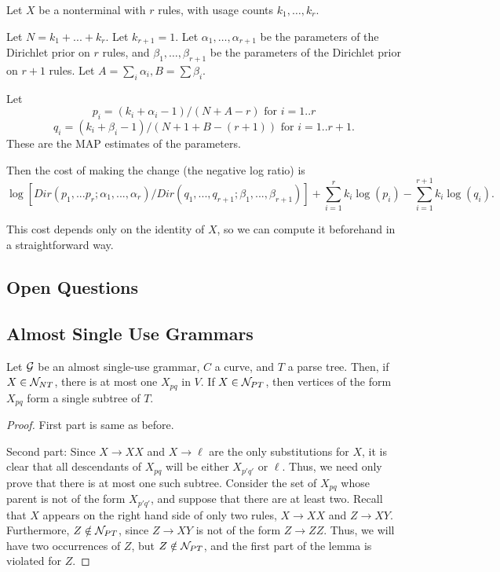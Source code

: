 Let $X$ be a nonterminal with $r$ rules, with usage counts $k_1, \dots,
k_r$.

Let $N = k_1 + ... + k_r$.  Let $k_{r+1} = 1$.  Let $\alpha_1, \dots,
\alpha_{r+1}$ be the parameters of the Dirichlet prior on $r$ rules,
and $\beta_1, \dots, \beta_{r+1}$ be the parameters of the Dirichlet
prior on $r+1$ rules. Let $A = \sum_i \alpha_i, B = \sum \beta_i$.

Let
$$p_i =  (k_i + \alpha_i -1) / ( N + A -r) \mbox{ for } i=1..r$$
$$q_i = (k_i + \beta_i -1) / ( N+1 + B -(r+1)) \mbox{ for } i=1..r+1.$$
These are the MAP estimates of the parameters. 

Then the cost of making the change (the negative log ratio) is
$$\log \left[ Dir(p_1,...p_r; \alpha_1,...,\alpha_r) /
Dir(q_1,...,q_{r+1}; \beta_1,...,\beta_{r+1}) \right] +
\sum_{i=1}^r k_i \log(p_i) - \sum_{i=1}^{r+1} k_i \log(q_i).$$

This cost depends only on the identity of $X$, so we can compute it
beforehand in a straightforward way.

\subsection{Open Questions}

\subsection{Almost Single Use Grammars}


\begin{lem}
Let ${\mathcal G}$ be an almost single-use grammar, $C$ a curve, and $T$ a
parse tree. Then, if $X\in {\mathcal N}_{NT}$, there is at most one $X_{pq}$
in $V$. If $X\in {\mathcal N}_{PT}$, then vertices of the form $X_{pq}$ form a
single subtree of $T$.
\end{lem}
\begin{proof}
First part is same as before.

Second part: Since $X\to XX$ and $X\to \ell$ are the only
substitutions for $X$, it is clear that all descendants of $X_{pq}$
will be either $X_{p'q'}$ or $\ell$. Thus, we need only prove that
there is at most one such subtree. Consider the set of $X_{pq}$ whose
parent is not of the form $X_{p'q'}$, and suppose that there are at
least two. Recall that $X$ appears on the right hand side of only two
rules, $X\to XX$ and $Z\to XY$. Furthermore, $Z\notin {\mathcal N}_{PT}$, since
$Z\to XY$ is not of the form $Z\to ZZ$. Thus, we will have two
occurrences of $Z$, but $Z\notin {\mathcal N}_{PT}$, and the first part of the
lemma is violated for $Z$.
\end{proof}


